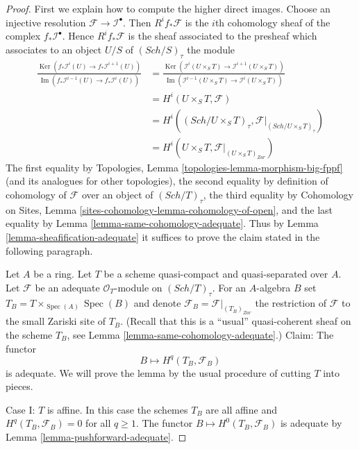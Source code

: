 \documentclass{stacks-project}
\theoremstyle{plain}
\theoremstyle{definition}
\theoremstyle{remark}
\numberwithin{equation}{subsection}
\def\Spec{\mathop{\mathrm{Spec}}}
\def\Sch{\mathit{Sch}}
\def\Ker{\mathop{\mathrm{Ker}}}
\def\Im{\mathop{\mathrm{Im}}}
\begin{document}
\begin{proof}
First we explain how to compute the higher direct images.
Choose an injective resolution $\mathcal{F} \to \mathcal{I}^\bullet$.
Then $R^if_*\mathcal{F}$ is the $i$th cohomology sheaf of the
complex $f_*\mathcal{I}^\bullet$.
Hence $R^if_*\mathcal{F}$ is the sheaf associated to the presheaf
which associates to an object $U/S$ of $(\Sch/S)_\tau$
the module
\begin{align*}
\frac{\Ker(f_*\mathcal{I}^i(U) \to f_*\mathcal{I}^{i + 1}(U))}
{\Im(f_*\mathcal{I}^{i - 1}(U) \to f_*\mathcal{I}^i(U))}
& =
\frac{\Ker(\mathcal{I}^i(U \times_S T) \to
\mathcal{I}^{i + 1}(U \times_S T))}
{\Im(\mathcal{I}^{i - 1}(U \times_S T) \to \mathcal{I}^i(U \times_S T))}
\\
& =
H^i(U \times_S T, \mathcal{F}) \\
& = H^i((\Sch/U \times_S T)_\tau,
\mathcal{F}|_{(\Sch/U \times_S T)_\tau}) \\
& = H^i(U \times_S T, \mathcal{F}|_{(U \times_S T)_{Zar}})
\end{align*}
The first equality by
Topologies, Lemma \ref{topologies-lemma-morphism-big-fppf}
(and its analogues for other topologies),
the second equality by definition of cohomology of $\mathcal{F}$
over an object of $(\Sch/T)_\tau$,
the third equality by
Cohomology on Sites, Lemma \ref{sites-cohomology-lemma-cohomology-of-open},
and the last equality by
Lemma \ref{lemma-same-cohomology-adequate}.
Thus by
Lemma \ref{lemma-sheafification-adequate}
it suffices to prove the claim stated in the following paragraph.

\medskip\noindent
Let $A$ be a ring. Let $T$ be a scheme quasi-compact and quasi-separated
over $A$. Let $\mathcal{F}$ be an adequate $\mathcal{O}_T$-module on
$(\Sch/T)_\tau$. For an $A$-algebra $B$ set
$T_B = T \times_{\Spec(A)} \Spec(B)$ and denote
$\mathcal{F}_B = \mathcal{F}|_{(T_B)_{Zar}}$ the restriction of
$\mathcal{F}$ to the small Zariski site of $T_B$.
(Recall that this is a ``usual'' quasi-coherent sheaf on the scheme
$T_B$, see
Lemma \ref{lemma-same-cohomology-adequate}.)
Claim: The functor
$$
B \longmapsto H^q(T_B, \mathcal{F}_B)
$$
is adequate. We will prove the lemma by the usual
procedure of cutting $T$ into pieces.

\medskip\noindent
Case I: $T$ is affine. In this case the schemes $T_B$ are all affine
and $H^q(T_B, \mathcal{F}_B) = 0$ for all $q \geq 1$.
The functor $B \mapsto H^0(T_B, \mathcal{F}_B)$ is adequate by
Lemma \ref{lemma-pushforward-adequate}.


\end{proof}
\end{document}
